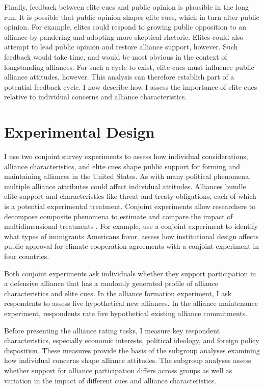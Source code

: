 \documentclass[12pt]{article}
\begin{document}
Finally, feedback between elite cues and public opinion is plausible in the long run. 
It is possible that public opinion shapes elite cues, which in turn alter public opinion. 
For example, elites could respond to growing public opposition to an alliance by pandering and adopting more skeptical rhetoric. 
Elites could also attempt to lead public opinion and restore alliance support, however.
Such feedback would take time, and would be most obvious in the context of longstanding alliances.
For such a cycle to exist, elite cues must influence public alliance attitudes, however.
This analysis can therefore establish part of a potential feedback cycle. 
I now describe how I assess the importance of elite cues relative to individual concerns and alliance characteristics. 



\section{Experimental Design}


I use two conjoint survey experiments to assess how individual considerations, alliance characteristics, and elite cues shape public support for forming and maintaining alliances in the United States. 
As with many political phenomena, multiple alliance attributes could affect individual attitudes. 
Alliances bundle elite support and characteristics like threat and treaty obligations, each of which is a potential experimental treatment.  
Conjoint experiments allow researchers to decompose composite phenomena to estimate and compare the impact of multidimensional treatments \citep{Hainmuelleretal2014}. 
For example, \citet{HainmuellerHopkins2015} use a conjoint experiment to identify what types of immigrants Americans favor. 
\citet{BechtelScheve2013} assess how institutional design affects public approval for climate cooperation agreements with a conjoint experiment in four countries. 


Both conjoint experiments ask individuals whether they support participation in a defensive alliance that has a randomly generated profile of alliance characteristics and elite cues. 
In the alliance formation experiment, I ask respondents to assess five hypothetical new alliances. 
In the alliance maintenance experiment, respondents rate five hypothetical existing alliance commitments.


Before presenting the alliance rating tasks, I measure key respondent characteristics, especially economic interests, political ideology, and foreign policy disposition.  
These measures provide the basis of the subgroup analyses examining how individual concerns shape alliance attitudes. 
The subgroup analyses assess whether support for alliance participation differs across groups as well as variation in the impact of different cues and alliance characteristics.
\end{document}
